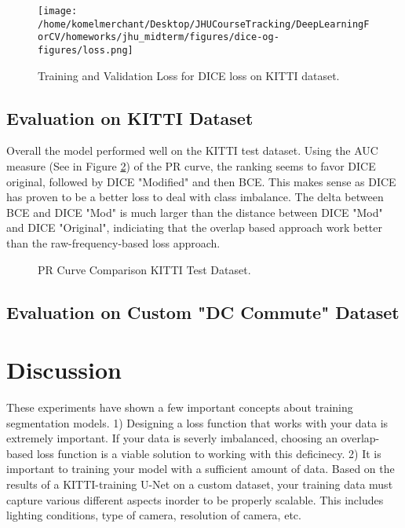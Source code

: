 \documentclass[Location Location Location! : Exploring Image Segmentation Problem In Urban Driving Scenarios]{IEEEtran}
\begin{document}
\begin{figure}[htbp]
\centerline{\texttt{[image: /home/komelmerchant/Desktop/JHUCourseTracking/DeepLearningForCV/homeworks/jhu\_midterm/figures/dice-og-figures/loss.png]}}
\caption{Training and Validation Loss for DICE loss on KITTI dataset.}
\label{dice-og-loss}
\end{figure}




\subsection{Evaluation on KITTI Dataset}


Overall the model performed well on the KITTI test dataset. Using the AUC measure (See in Figure \ref{pr-curve}) of the PR curve, the ranking seems to favor DICE original, followed by DICE "Modified" and then BCE. This makes sense as DICE has proven to be a better loss to deal with class imbalance. The delta between BCE and DICE "Mod" is much larger than the distance between DICE "Mod" and DICE "Original", indiciating that the overlap based approach work better than the raw-frequency-based loss approach. 


\begin{figure}[htbp]
\caption{PR Curve Comparison KITTI Test Dataset.}
\label{pr-curve}
\end{figure}







\subsection{Evaluation on Custom "DC Commute" Dataset}



\section{Discussion}

These experiments have shown a few important concepts about training segmentation models. 1) Designing a loss function that works with your data is extremely important. If your data is severly imbalanced, choosing an overlap-based loss function is a viable solution to working with this deficinecy. 2) It is important to training your model with a sufficient amount of data. Based on the results of a KITTI-training U-Net on a custom dataset, your training data must capture various different aspects inorder to be properly scalable. This includes lighting conditions, type of camera, resolution of camera, etc. 
\end{document}
